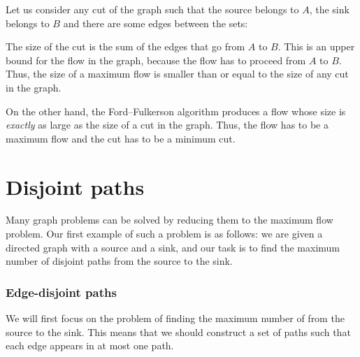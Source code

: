 Let us consider any cut of the graph
such that the source belongs to $A$,
the sink belongs to $B$
and there are some edges between the sets:

\begin{center}
\end{center}

The size of the cut is the sum of the edges
that go from $A$ to $B$.
This is an upper bound for the flow
in the graph, because the flow has to proceed
from $A$ to $B$.
Thus, the size of a maximum flow is smaller than or equal to
the size of any cut in the graph.

On the other hand, the Ford–Fulkerson algorithm
produces a flow whose size is \emph{exactly} as large
as the size of a cut in the graph.
Thus, the flow has to be a maximum flow
and the cut has to be a minimum cut.

\section{Disjoint paths}

Many graph problems can be solved by reducing
them to the maximum flow problem.
Our first example of such a problem is
as follows: we are given a directed graph
with a source and a sink,
and our task is to find the maximum number
of disjoint paths from the source to the sink.

\subsubsection{Edge-disjoint paths}

We will first focus on the problem of
finding the maximum number of
 from the source to the sink.
This means that we should construct a set of paths
such that each edge appears in at most one path.

